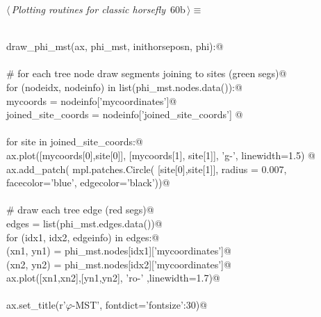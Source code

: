 \documentclass[11.5pt]{report}
\begin{document}
\vspace{-0.8cm} \newchunk 

\begin{flushleft} \small\label{scrap91}\raggedright\small
{} $\langle\,${\itshape Plotting routines for classic horsefly}\nobreak\ {\footnotesize {60b}}$\,\rangle\equiv$
\vspace{-1ex}
\begin{list}{}{} \item
\mbox{}\verb@@\\
\mbox{}\verb@def draw_phi_mst(ax, phi_mst, inithorseposn, phi):@\\
\mbox{}\verb@@\\
\mbox{}\verb@     # for each tree node draw segments joining to sites (green segs)@\\
\mbox{}\verb@     for (nodeidx, nodeinfo) in list(phi_mst.nodes.data()):@\\
\mbox{}\verb@         mycoords           = nodeinfo['mycoordinates']@\\
\mbox{}\verb@         joined_site_coords = nodeinfo['joined_site_coords'] @\\
\mbox{}\verb@@\\
\mbox{}\verb@         for site in joined_site_coords:@\\
\mbox{}\verb@               ax.plot([mycoords[0],site[0]], [mycoords[1], site[1]], 'g-', linewidth=1.5) @\\
\mbox{}\verb@               ax.add_patch( mpl.patches.Circle( [site[0],site[1]], radius = 0.007, \@\\
\mbox{}\verb@                                                 facecolor='blue', edgecolor='black'))@\\
\mbox{}\verb@@\\
\mbox{}\verb@     # draw each tree edge (red segs)@\\
\mbox{}\verb@     edges = list(phi_mst.edges.data())@\\
\mbox{}\verb@     for (idx1, idx2, edgeinfo) in edges:@\\
\mbox{}\verb@          (xn1, yn1) =  phi_mst.nodes[idx1]['mycoordinates']@\\
\mbox{}\verb@          (xn2, yn2) =  phi_mst.nodes[idx2]['mycoordinates']@\\
\mbox{}\verb@          ax.plot([xn1,xn2],[yn1,yn2], 'ro-' ,linewidth=1.7)@\\
\mbox{}\verb@@\\
\mbox{}\verb@     ax.set_title(r'$\varphi$-MST', fontdict={'fontsize':30})@\\

\end{list}
\end{flushleft}
\end{document}

